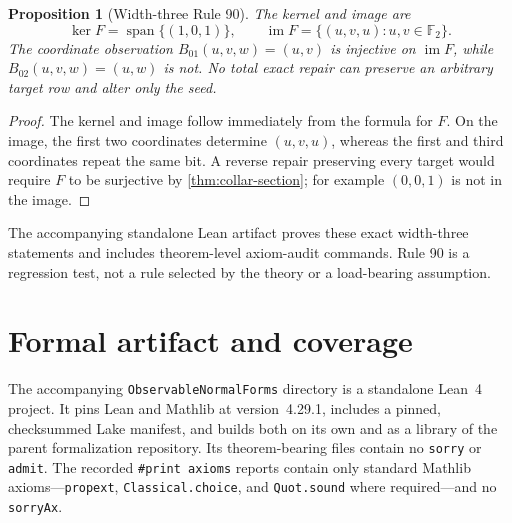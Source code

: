 \documentclass[11pt]{article}
\newtheorem{proposition}[theorem]{Proposition}
\theoremstyle{definition}
\theoremstyle{remark}
\numberwithin{equation}{section}
\newcommand{\im}{\operatorname{im}}
\begin{document}
\begin{proposition}[Width-three Rule 90]
The kernel and image are
\[
 \ker F=\operatorname{span}\{(1,0,1)\},
 \qquad
 \im F=\{(u,v,u):u,v\in\mathbb F_2\}.
\]
The coordinate observation $B_{01}(u,v,w)=(u,v)$ is injective on $\im F$, while $B_{02}(u,v,w)=(u,w)$ is not.  No total exact repair can preserve an arbitrary target row and alter only the seed.
\end{proposition}

\begin{proof}
The kernel and image follow immediately from the formula for $F$.  On the image, the first two coordinates determine $(u,v,u)$, whereas the first and third coordinates repeat the same bit.  A reverse repair preserving every target would require $F$ to be surjective by \cref{thm:collar-section}; for example $(0,0,1)$ is not in the image.
\end{proof}

The accompanying standalone Lean artifact proves these exact width-three statements and includes theorem-level axiom-audit commands.  Rule 90 is a regression test, not a rule selected by the theory or a load-bearing assumption.

\section{Formal artifact and coverage}\label{sec:lean}

The accompanying \texttt{ObservableNormalForms} directory is a standalone
Lean~4 project.  It pins Lean and Mathlib at version~4.29.1, includes a
pinned, checksummed Lake manifest, and builds both on its own and as a library of the
parent formalization repository.  Its theorem-bearing files contain no
\texttt{sorry} or \texttt{admit}.  The recorded \texttt{\#print axioms}
reports contain only standard Mathlib axioms---\texttt{propext},
\texttt{Classical.choice}, and \texttt{Quot.sound} where required---and no
\texttt{sorryAx}.
\end{document}
